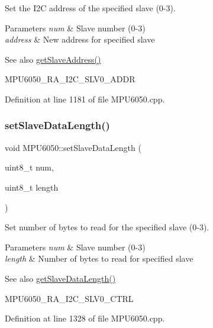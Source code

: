 Set the I2C address of the specified slave (0-\/3). 


\begin{DoxyParams}{Parameters}
{\em num} & Slave number (0-\/3) \\
\hline
{\em address} & New address for specified slave \\
\hline
\end{DoxyParams}
\begin{DoxySeeAlso}{See also}
\mbox{\hyperlink{classMPU6050_af75b9f7ccac48515c7544238db0e6863}{get\+Slave\+Address()}} 

M\+P\+U6050\+\_\+\+R\+A\+\_\+\+I2\+C\+\_\+\+S\+L\+V0\+\_\+\+A\+D\+DR 
\end{DoxySeeAlso}


Definition at line 1181 of file M\+P\+U6050.\+cpp.

\mbox{\label{classMPU6050_ab4151353f433c533246d938fc3b78458}} 
\subsubsection{\texorpdfstring{setSlaveDataLength()}{setSlaveDataLength()}}
{\footnotesize\ttfamily void M\+P\+U6050\+::set\+Slave\+Data\+Length (\begin{DoxyParamCaption}\item[{uint8\+\_\+t}]{num,  }\item[{uint8\+\_\+t}]{length }\end{DoxyParamCaption})}



Set number of bytes to read for the specified slave (0-\/3). 


\begin{DoxyParams}{Parameters}
{\em num} & Slave number (0-\/3) \\
\hline
{\em length} & Number of bytes to read for specified slave \\
\hline
\end{DoxyParams}
\begin{DoxySeeAlso}{See also}
\mbox{\hyperlink{classMPU6050_a54c2a48b3cb79106bcaf75accf6cd311}{get\+Slave\+Data\+Length()}} 

M\+P\+U6050\+\_\+\+R\+A\+\_\+\+I2\+C\+\_\+\+S\+L\+V0\+\_\+\+C\+T\+RL 
\end{DoxySeeAlso}


Definition at line 1328 of file M\+P\+U6050.\+cpp.

